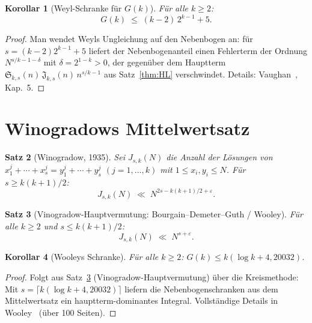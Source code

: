 \documentclass[12pt,a4paper]{amsart}
\newtheorem{theorem}{Satz}[section]
\newtheorem{korollar}[theorem]{Korollar}
\theoremstyle{definition}
\begin{document}
\begin{korollar}[Weyl-Schranke für $G(k)$]\label{cor:gk_weyl}
  Für alle $k \geq 2$:
  \[
    G(k) \;\leq\; (k-2)\,2^{k-1} + 5.
  \]
\end{korollar}

\begin{proof}
  Man wendet Weyls Ungleichung auf den Nebenbogen an: für $s = (k-2)2^{k-1}+5$
  liefert der Nebenbogenanteil einen Fehlerterm der Ordnung $N^{s/k-1-\delta}$
  mit $\delta = 2^{1-k} > 0$, der gegenüber dem Hauptterm $\mathfrak{S}_{k,s}(n)\,
  \mathfrak{J}_{k,s}(n)\, n^{s/k-1}$ aus Satz~\ref{thm:HL} verschwindet.
  Details: Vaughan~\cite{Vaughan1981}, Kap.~5.
\end{proof}

\section{Winogradows Mittelwertsatz}
\label{sec:mvs}

\begin{theorem}[Winogradow, 1935]\label{thm:wmvt}
  Sei $J_{s,k}(N)$ die Anzahl der Lösungen von
  $x_1^j + \cdots + x_s^j = y_1^j + \cdots + y_s^j$ $(j=1,\ldots,k)$
  mit $1 \leq x_i, y_i \leq N$.  Für $s \geq k(k+1)/2$:
  \[
    J_{s,k}(N) \;\ll\; N^{2s - k(k+1)/2 + \varepsilon}.
  \]
\end{theorem}

\begin{theorem}[Vinogradow-Hauptvermutung: Bourgain--Demeter--Guth / Wooley]\label{thm:bdg}
  Für alle $k \geq 2$ und $s \leq k(k+1)/2$:
  \[
    J_{s,k}(N) \;\ll\; N^{s + \varepsilon}.
  \]
\end{theorem}

\begin{korollar}[Wooleys Schranke]\label{cor:wooley}
  Für alle $k \geq 2$: $G(k) \leq k(\log k + 4{,}20032)$.
\end{korollar}

\begin{proof}
  Folgt aus Satz~\ref{thm:bdg} (Vinogradow-Hauptvermutung) über die
  Kreismethode: Mit $s = \lceil k(\log k + 4{,}20032)\rceil$ liefern die
  Nebenbogenschranken aus dem Mittelwertsatz ein hauptterm-dominantes Integral.
  Vollständige Details in Wooley~\cite{Wooley2016} (über 100 Seiten).
\end{proof}

\end{document}
